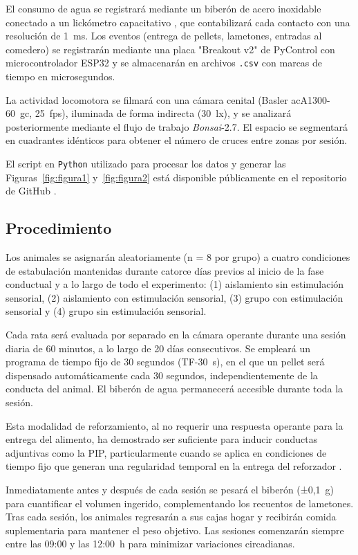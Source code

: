 \documentclass[12pt,a4paper]{article}
\begin{document}
\begin{multicols}{2}
El consumo de agua se registrará mediante un biberón de acero inoxidable conectado a un lickómetro capacitativo \citep{pycontrol_lickometer}, que contabilizará cada contacto con una resolución de 1~ms. Los eventos (entrega de pellets, lametones, entradas al comedero) se registrarán mediante una placa "Breakout v2" de PyControl con microcontrolador ESP32 y se almacenarán en archivos \texttt{.csv} con marcas de tiempo en microsegundos.

La actividad locomotora se filmará con una cámara cenital (Basler acA1300-60~gc, 25~fps), iluminada de forma indirecta (30~lx), y se analizará posteriormente mediante el flujo de trabajo \textit{Bonsai}-2.7. El espacio se segmentará en cuadrantes idénticos para obtener el número de cruces entre zonas por sesión.

El script en \texttt{Python} utilizado para procesar los datos y generar las Figuras~\ref{fig:figura1} y~\ref{fig:figura2} está disponible públicamente en el repositorio de GitHub \citep{Pena2025}.

\subsection*{Procedimiento}

Los animales se asignarán aleatoriamente (n = 8 por grupo) a cuatro condiciones de estabulación mantenidas durante catorce días previos al inicio de la fase conductual y a lo largo de todo el experimento: (1) aislamiento sin estimulación sensorial, (2) aislamiento con estimulación sensorial, (3) grupo con estimulación sensorial y (4) grupo sin estimulación sensorial.


Cada rata será evaluada por separado en la cámara operante durante una sesión diaria de 60 minutos, a lo largo de 20 días consecutivos. Se empleará un programa de tiempo fijo de 30 segundos (TF-30~s), en el que un pellet será dispensado automáticamente cada 30 segundos, independientemente de la conducta del animal. El biberón de agua permanecerá accesible durante toda la sesión.

Esta modalidad de reforzamiento, al no requerir una respuesta operante para la entrega del alimento, ha demostrado ser suficiente para inducir conductas adjuntivas como la PIP, particularmente cuando se aplica en condiciones de tiempo fijo que generan una regularidad temporal en la entrega del reforzador \citep{LASHLEY1980411}.

Inmediatamente antes y después de cada sesión se pesará el biberón (±0,1~g) para cuantificar el volumen ingerido, complementando los recuentos de lametones. Tras cada sesión, los animales regresarán a sus cajas hogar y recibirán comida suplementaria para mantener el peso objetivo. Las sesiones comenzarán siempre entre las 09:00 y las 12:00~h para minimizar variaciones circadianas.


\end{multicols}
\end{document}
